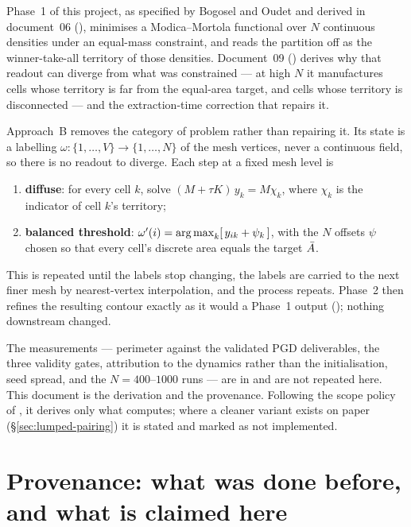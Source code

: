 \documentclass[11pt,a4paper]{article}
\begin{document}
Phase~1 of this project, as specified by Bogosel and Oudet
\cite{bogosel2017partitions} and derived in document~06
(), minimises a
Modica--Mortola functional over $N$ continuous densities under an equal-mass
constraint, and reads the partition off as the winner-take-all territory of those
densities. Document~09 () derives why
that readout can diverge from what was constrained --- at high $N$ it
manufactures cells whose territory is far from the equal-area target, and cells
whose territory is disconnected --- and the extraction-time correction that
repairs it.

Approach~B removes the category of problem rather than repairing it. Its state is
a labelling $\omega : \{1,\dots,V\} \to \{1,\dots,N\}$ of the mesh vertices, never
a continuous field, so there is no readout to diverge. Each step at a fixed mesh
level is
\begin{enumerate}[itemsep=1pt]
  \item \textbf{diffuse}: for every cell $k$, solve $(M + \tau K)\, y_k = M \chi_k$,
    where $\chi_k$ is the indicator of cell $k$'s territory;
  \item \textbf{balanced threshold}: $\omega'(i) = \operatorname*{arg\,max}_k [\, y_{ik} + \psi_k \,]$,
    with the $N$ offsets $\psi$ chosen so that every cell's discrete area equals
    the target $\bar{A}$.
\end{enumerate}
This is repeated until the labels stop changing, the labels are carried to the
next finer mesh by nearest-vertex interpolation, and the process repeats. Phase~2
then refines the resulting contour exactly as it would a Phase~1 output
(); nothing downstream
changed.

The measurements --- perimeter against the validated PGD deliverables, the three
validity gates, attribution to the dynamics rather than the initialisation, seed
spread, and the $N = 400$--$1000$ runs --- are in
 and are not repeated here.
This document is the derivation and the provenance. Following the scope policy of
, it derives only what
 computes; where a cleaner variant exists
on paper (\S\ref{sec:lumped-pairing}) it is stated and marked as not implemented.

\section{Provenance: what was done before, and what is claimed here}
\label{sec:provenance}
\end{document}
